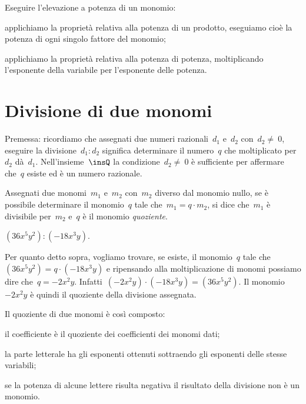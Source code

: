 \begin{procedura}
Eseguire l'elevazione a potenza di un monomio:

\begin{enumeratea}
 \item applichiamo la proprietà relativa alla potenza di un prodotto,
eseguiamo cioè la potenza di ogni singolo fattore del monomio;
 \item applichiamo la proprietà relativa alla potenza di potenza,
moltiplicando l'esponente della variabile per l'esponente delle potenza.
\end{enumeratea}
\end{procedura}

\ovalbox{\risolvii \ref{ese:10.16}, \ref{ese:10.17}, \ref{ese:10.18}, \ref{ese:10.19}}

\section{Divisione di due monomi}

Premessa: ricordiamo che assegnati due numeri razionali~$d_{1}$
e~$d_{2}$ con~$d_{2}\neq~0$, eseguire la
divisione~$d_{1}:d_{2}$ significa determinare il numero~$q$
che moltiplicato per~$d_{2}$ dà~$d_{1}$.
Nell'insieme~$\insQ$ la condizione~$d_{2}\neq~0$ è sufficiente per
affermare che~$q$ esiste ed è un numero razionale.

\begin{definizione}
Assegnati due monomi~$m_{1}$ e~$m_{2}$ con~$m_{2}$ diverso dal monomio nullo, se
è possibile determinare il monomio~$q$ tale che~$m_{1} = q\cdot m_{2}$, si dice che~$m_{1}$ è
divisibile per~$m_{2}$ e~$q$ è il monomio \emph{quoziente}.
\end{definizione}

\begin{exrig}
 \begin{esempio}
$(36x^{5}y^{2}):(-18x^{3}y)$.

Per quanto detto sopra, vogliamo trovare, se esiste, il monomio~$q$ tale
che~$(36x^{5}y^{2})=q\cdot (-18x^{3}y)$
e ripensando alla moltiplicazione di monomi possiamo dire
che~$q=-2x^{2}y$. Infatti~$(-2x^{2}y)\cdot(-18x^{3}y)=(36x^{5}y^{2})$. Il monomio~$-2x^{2}y$
è quindi il quoziente della divisione assegnata.
 \end{esempio}
\end{exrig}

\begin{procedura}
Il quoziente di due monomi è così composto:

\begin{enumeratea}
 \item il coefficiente è il quoziente dei coefficienti dei monomi dati;
 \item la parte letterale ha gli esponenti ottenuti sottraendo gli esponenti
delle stesse variabili;
 \item se la potenza di alcune lettere risulta negativa il risultato della
divisione non è un monomio.
\end{enumeratea}
\end{procedura}

